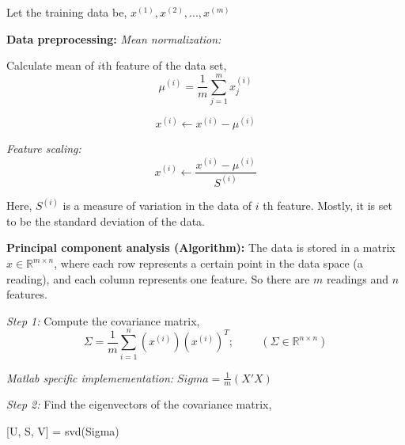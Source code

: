 \vspace{0.5cm}

\noindent Let the training data be, $ x^{(1)}, x^{(2)}, ... , x^{(m)} $

\noindent \textbf{Data preprocessing: }
\vspace{0.3cm}
\noindent\emph{Mean normalization: } 

\noindent Calculate mean of $ i $th feature of the data set,
\begin{equation}
	\mu^{(i)} = \frac{1}{m} \sum_{j=1}^{m} x_j^{(i)}
\end{equation}

\begin{equation}
	x^{(i)} \leftarrow x^{(i)} - \mu^{(i)} 
\end{equation}


\noindent\emph{Feature scaling: }
\begin{equation}
	x^{(i)} \leftarrow \frac{x^{(i)} - \mu^{(i)}}{S^{(i)}}
\end{equation}

\noindent Here, $ S^{(i)} $ is a measure of variation in the data of $ i $
th feature. Mostly, it is set to be the standard deviation of the data.

\vspace{0.5cm}

\noindent \textbf{Principal component analysis (Algorithm): }
\noindent The data is stored in a matrix $ x \in \mathbb{R}^{m \times n} $, where
each row represents a certain point in the data space (a reading), and each column
represents one feature. So there are $ m $ readings and $ n $ features.

\vspace{0.3cm}

\noindent \emph{Step 1:} Compute the covariance matrix,
\begin{equation}
	\Sigma = \frac{1}{m} \sum_{i=1}^{n} (x^{(i)}) (x^{(i)})^T; 
	\hspace{1cm} (\Sigma \in \mathbb{R}^{n \times n})
\end{equation}

\vspace{0.25cm}

\noindent \emph{Matlab specific implemementation:} $ Sigma = \frac{1}{m} (X' X) $

\vspace{0.5cm}

\noindent \emph{Step 2:} Find the eigenvectors of the covariance matrix,
\begin{center}
	[U, S, V] = svd(Sigma)
\end{center}

